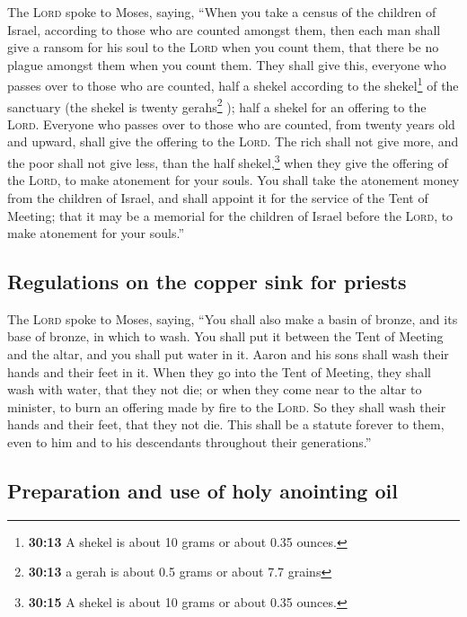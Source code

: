  The \textsc{Lord} spoke to Moses, saying,
 ``When you take a census of the children of Israel,
according to those who are counted amongst them, then each man shall
give a ransom for his soul to the \textsc{Lord} when you count them,
that there be no plague amongst them when you count them.
 They shall give this, everyone who passes over to those
who are counted, half a shekel according to the shekel\footnote{\textbf{30:13}
  A shekel is about 10 grams or about 0.35 ounces.} of the sanctuary
(the shekel is twenty gerahs\footnote{\textbf{30:13} a gerah is about
  0.5 grams or about 7.7 grains} ); half a shekel for an offering to the
\textsc{Lord}.  Everyone who passes over to those who are
counted, from twenty years old and upward, shall give the offering to
the \textsc{Lord}.  The rich shall not give more, and the
poor shall not give less, than the half shekel,\footnote{\textbf{30:15}
  A shekel is about 10 grams or about 0.35 ounces.} when they give the
offering of the \textsc{Lord}, to make atonement for your souls.
 You shall take the atonement money from the children of
Israel, and shall appoint it for the service of the Tent of Meeting;
that it may be a memorial for the children of Israel before the
\textsc{Lord}, to make atonement for your souls.''

\hypertarget{regulations-on-the-copper-sink-for-priests}{%
\subsection{Regulations on the copper sink for
priests}\label{regulations-on-the-copper-sink-for-priests}}

 The \textsc{Lord} spoke to Moses, saying,
 ``You shall also make a basin of bronze, and its base of
bronze, in which to wash. You shall put it between the Tent of Meeting
and the altar, and you shall put water in it.  Aaron and
his sons shall wash their hands and their feet in it. 
When they go into the Tent of Meeting, they shall wash with water, that
they not die; or when they come near to the altar to minister, to burn
an offering made by fire to the \textsc{Lord}.  So they
shall wash their hands and their feet, that they not die. This shall be
a statute forever to them, even to him and to his descendants throughout
their generations.''

\hypertarget{preparation-and-use-of-holy-anointing-oil}{%
\subsection{Preparation and use of holy anointing
oil}\label{preparation-and-use-of-holy-anointing-oil}}

